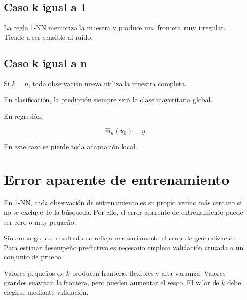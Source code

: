 \documentclass[
  spanish,
  10.5pt,
  letterpaper,
  DIV=11,
  numbers=noendperiod,
  oneside,
  open=any]{scrreprt}
\theoremstyle{definition}
\theoremstyle{definition}
\theoremstyle{plain}
\theoremstyle{remark}
\begin{document}

\subsection*{Caso k igual a 1}\label{caso-k-igual-a-1}

La regla 1-NN memoriza la muestra y produce una frontera muy irregular.
Tiende a ser sensible al ruido.

\subsection*{Caso k igual a n}\label{caso-k-igual-a-n}

Si \(k=n\), toda observación nueva utiliza la muestra completa.

En clasificación, la predicción siempre será la clase mayoritaria
global.

En regresión,

\[
\widehat{m}_n(\mathbf{x}_0)=\overline{y}.
\]

En este caso se pierde toda adaptación local.

\section*{Error aparente de
entrenamiento}\label{error-aparente-de-entrenamiento}


En 1-NN, cada observación de entrenamiento es su propio vecino más
cercano si no se excluye de la búsqueda. Por ello, el error aparente de
entrenamiento puede ser cero o muy pequeño.

Sin embargo, ese resultado no refleja necesariamente el error de
generalización. Para estimar desempeño predictivo es necesario emplear
validación cruzada o un conjunto de prueba.

\begin{tcolorbox}[enhanced jigsaw, arc=.35mm, bottomrule=.15mm, bottomtitle=1mm, breakable, colback=white, colbacktitle=quarto-callout-note-color!10!white, colframe=quarto-callout-note-color-frame, coltitle=black, left=2mm, leftrule=.75mm, opacityback=0, opacitybacktitle=0.6, rightrule=.15mm, title=\textcolor{quarto-callout-note-color}{\faInfo}\hspace{0.5em}{Compromiso sesgo-varianza}, titlerule=0mm, toprule=.15mm, toptitle=1mm]

Valores pequeños de \(k\) producen fronteras flexibles y alta varianza.
Valores grandes suavizan la frontera, pero pueden aumentar el sesgo. El
valor de \(k\) debe elegirse mediante validación.

\end{tcolorbox}
\end{document}
